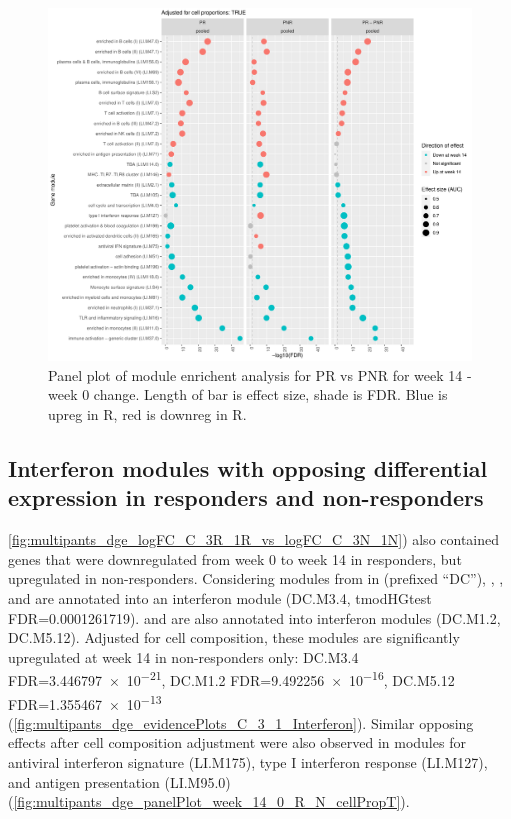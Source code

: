 \begin{outline}
\begin{figure}
    \centering
    \includegraphics[width=1.0\textwidth,page=1]{mainmatter/figures/chapter_04/plot_gene_set_enrichment.tmodCERNO_panelplot_reversed_C_3R_1R,C_3N_1N,C_(3R_1R)_(3N_1N).cell_prop_correction_TRUE.pdf}
    \caption{Panel plot of module enrichent analysis for PR vs PNR for week 14 - week 0 change. Length of bar is effect size, shade is FDR. Blue is upreg in R, red is downreg in R.}
    \label{fig:multipants_dge_panelPlot_week_14_0_R_N_cellPropT}
\end{figure}

\subsection{Interferon modules with opposing differential expression in responders and non-responders}
\label{subsec:multipants_dge_opposing_interferon}

\autoref{fig:multipants_dge_logFC_C_3R_1R_vs_logFC_C_3N_1N}) also contained genes that were downregulated from week 0 to week 14 in responders, but upregulated in non-responders.
Considering modules from \autocite{chaussabel2008ModularAnalysisFramework} in  (prefixed \enquote{DC}),
, , and  are annotated into an interferon module (DC.M3.4, tmodHGtest FDR=\num{0.0001261719}).
 and  are also annotated into interferon modules (DC.M1.2, DC.M5.12).
Adjusted for cell composition, these modules are significantly upregulated at week 14 in non-responders only: 
DC.M3.4
FDR=\num{3.446797e-21},
DC.M1.2
FDR=\num{9.492256e-16},
DC.M5.12
FDR=\num{1.355467e-13}
(\autoref{fig:multipants_dge_evidencePlots_C_3_1_Interferon}).
Similar opposing effects after cell composition adjustment were also observed in \autocite{li2013MolecularSignaturesAntibody} modules for
antiviral interferon signature (LI.M175), type I interferon response (LI.M127), and antigen presentation (LI.M95.0) (\autoref{fig:multipants_dge_panelPlot_week_14_0_R_N_cellPropT}).


\end{outline}
